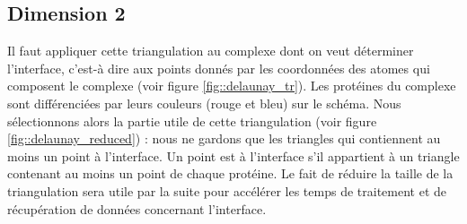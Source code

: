 \subsection{Dimension 2}

Il faut appliquer cette triangulation au complexe dont on veut déterminer l'interface, c'est-à dire
aux points donnés par les coordonnées des atomes qui composent le complexe
(voir figure \ref{fig::delaunay_tr}). Les protéines du complexe sont différenciées
par leurs couleurs (rouge et bleu) sur le schéma. Nous sélectionnons alors la partie utile de
cette triangulation (voir figure \ref{fig::delaunay_reduced}) : nous ne gardons que
les triangles qui contiennent au moins un point à l'interface.
Un point est à l'interface s'il appartient à un triangle contenant au moins un point
de chaque protéine. Le fait de réduire la taille de la triangulation sera utile par la suite
pour accélérer les temps de traitement et de récupération de données concernant l'interface.



